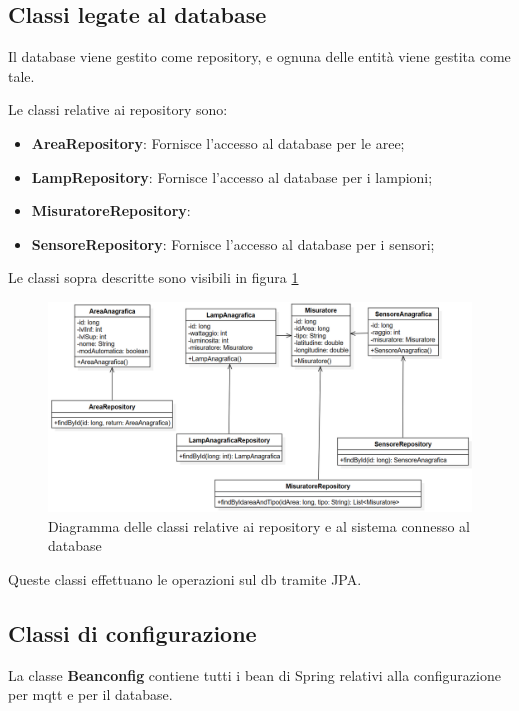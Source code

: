\subsection{Classi legate al database}

Il database viene gestito come repository, e ognuna delle entità viene gestita come tale.

Le classi relative ai repository sono:

\begin{itemize}
    \item \textbf{AreaRepository}: Fornisce l'accesso al database per le aree;
    \item \textbf{LampRepository}: Fornisce l'accesso al database per i lampioni;
    \item \textbf{MisuratoreRepository}: 
    \item \textbf{SensoreRepository}: Fornisce l'accesso al database per i sensori;
\end{itemize}

Le classi sopra descritte sono visibili in figura \ref{fig:coordinazione_db}

\begin{figure}[h]
    \centering
    \includegraphics[width=\textwidth]{img/illuminazione_repository.png}
    \caption{Diagramma delle classi relative ai repository e al sistema connesso al database}
    \label{fig:coordinazione_db}
\end{figure}

Queste classi effettuano le operazioni sul db tramite JPA.

\subsection{Classi di configurazione}

La classe \textbf{Beanconfig} contiene tutti i bean di Spring relativi alla configurazione per mqtt e per il database.

